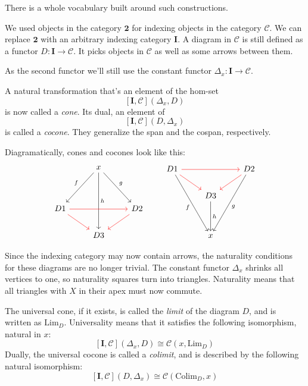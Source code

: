\documentclass[DaoFP]{subfiles}
\begin{document}
There is a whole vocabulary built around such constructions. 

We used objects in the category $\mathbf{2}$ for indexing objects in the category $\mathcal{C}$. We can replace $\mathbf{2}$ with an arbitrary indexing category $\mathbf{I}$. A diagram in $\mathcal{C}$ is still defined as a functor $D \colon \mathbf{I} \to \mathcal{C}$. It picks objects in $\mathcal{C}$ as well as some arrows between them.

As the second functor we'll still use the constant functor $\Delta_x \colon \mathbf{I} \to \mathcal{C}$.

A  natural transformation that's an element of the hom-set
\[ [\mathbf{I}, \mathcal{C}](\Delta_x, D)  \]
is now called a \emph{cone}. Its dual, an element of
\[ [\mathbf{I}, \mathcal{C}](D, \Delta_x)  \]
is called a \emph{cocone}. They generalize the span and the cospan, respectively.

Diagramatically, cones and cocones look like this:
\[
 \begin{tikzcd}
  & x
\arrow[ddr, "g"]
 \arrow[ddl, "f"']
 \arrow[ddd, "h"]
 \\
\\
D 1 
\arrow[rr, red]
\arrow[rd, red]
&& D 2
\arrow[dl, red]
\\
& D 3
 \end{tikzcd}
 \qquad
\begin{tikzcd}
 D 1
 \arrow[rr, red]
 \arrow[dr, red]
 \arrow[dddr, "f"']
 && D 2
\arrow[dl, red]
 \arrow[dddl, "g"]
 \\
 & D 3
 \arrow[dd, "h"]
 \\
 \\
 & x
 \end{tikzcd}
 \]

Since the indexing category may now contain arrows, the naturality conditions for these diagrams are no longer trivial. The constant functor $\Delta_x$ shrinks all vertices to one, so naturality squares turn into triangles. Naturality means that all triangles with $X$ in their apex must now commute. 

The universal cone, if it exists, is called the \emph{limit} of the diagram $D$, and is written as $\text{Lim}_D$. Universality means that it satisfies the following isomorphism, natural in $x$:
\[ [\mathbf{I}, \mathcal{C}](\Delta_x, D)  \cong \mathcal{C}(x, \text{Lim}_D) \]
Dually, the universal cocone is called a \emph{colimit}, and is described by the following natural isomorphism:
\[ [\mathbf{I}, \mathcal{C}](D, \Delta_x)  \cong \mathcal{C}( \text{Colim}_D, x) \]
\end{document}
